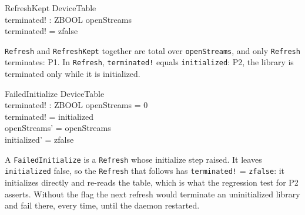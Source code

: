 \documentclass[a4paper,10pt,fleqn]{article}
\begin{document}
\begin{schema}{RefreshKept}
  \Xi DeviceTable \\
  terminated! : ZBOOL
\where
  openStreams  \\
  terminated! = zfalse
\end{schema}

\texttt{Refresh} and \texttt{RefreshKept} together are total over
\texttt{openStreams}, and only \texttt{Refresh} terminates: P1. In
\texttt{Refresh}, \texttt{terminated!} equals \texttt{initialized}: P2, the
library is terminated only while it is initialized.

\begin{schema}{FailedInitialize}
  \Delta DeviceTable \\
  terminated! : ZBOOL
\where
  openStreams = 0 \\
  terminated! = initialized \\
  openStreams' = openStreams \\
  initialized' = zfalse
\end{schema}

A \texttt{FailedInitialize} is a \texttt{Refresh} whose initialize step
raised. It leaves \texttt{initialized} false, so the \texttt{Refresh} that
follows has \texttt{terminated!} = \texttt{zfalse}: it initializes directly
and re-reads the table, which is what the regression test for P2 asserts.
Without the flag the next refresh would terminate an uninitialized library
and fail there, every time, until the daemon restarted.
\end{document}
